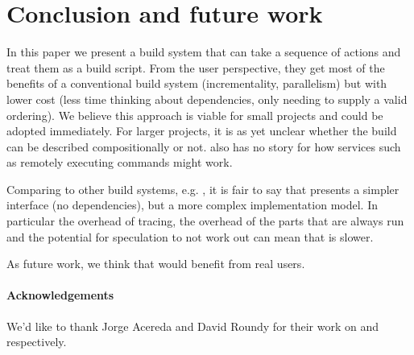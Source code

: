 \section{Conclusion and future work}
\label{sec:conclusion}

In this paper we present a build system that can take a sequence of actions and treat them as a build script. From the user perspective, they get most of the benefits of a conventional build system (incrementality, parallelism) but with lower cost (less time thinking about dependencies, only needing to supply a valid ordering). We believe this approach is viable for small projects and could be adopted immediately. For larger projects, it is as yet unclear whether the build can be described compositionally or not. \Rattle also has no story for how services such as remotely executing commands might work.

Comparing \Rattle to other build systems, e.g. \Make, it is fair to say that \Rattle presents a simpler interface (no dependencies), but a more complex implementation model. In particular the overhead of tracing, the overhead of the parts that are always run and the potential for speculation to not work out can mean that \Rattle is slower.

As future work, we think that \Rattle would benefit from real users.

\paragraph{Acknowledgements} We'd like to thank Jorge Acereda and David Roundy for their work on \Fsatrace and \libbigbro respectively.
